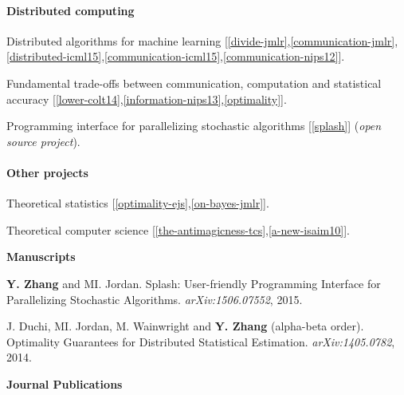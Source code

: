 \documentclass{res} %
\newenvironment{my_item}{
\begin{itemize}
  \setlength{\itemsep}{0pt}
  \setlength{\parskip}{0pt}
  \setlength{\parsep}{0pt}}
{\end{itemize}
}
\begin{document}
\begin{resume}
\vspace{-10pt}
\paragraph{Distributed computing}
\begin{my_item}
\item Distributed algorithms for machine learning [\ref{divide-jmlr},\ref{communication-jmlr},\ref{distributed-icml15},\ref{communication-icml15},\ref{communication-nips12}].
\item Fundamental trade-offs between communication, computation and statistical accuracy [\ref{lower-colt14},\ref{information-nips13},\ref{optimality}].
\item Programming interface for parallelizing stochastic algorithms [\ref{splash}] (\emph{open source project}). 
\end{my_item}

\vspace{-10pt}
\paragraph{Other projects}
\begin{my_item}
\item Theoretical statistics [\ref{optimality-ejs},\ref{on-bayes-jmlr}].
\item Theoretical computer science [\ref{the-antimagicness-tcs},\ref{a-new-isaim10}].
\end{my_item}

{\bf\Large Manuscripts}
\vspace{5pt}

\begin{enumerate}[label={[M\arabic*]}, ref={M\arabic*}]
\item \label{splash}\textbf{Y. Zhang} and MI. Jordan. Splash: User-friendly Programming Interface for Parallelizing Stochastic Algorithms. \emph{arXiv:1506.07552}, 2015.

\item J. Duchi, MI. Jordan, M. Wainwright and \textbf{Y. Zhang} (alpha-beta order). Optimality Guarantees for Distributed Statistical Estimation. \emph{arXiv:1405.0782}, 2014.\label{optimality}
\end{enumerate}

{\bf\Large Journal Publications}
\vspace{5pt}

\begin{enumerate}[label={[J\arabic*]}, ref={J\arabic*}]


\end{enumerate}
\end{resume}
\end{document}
